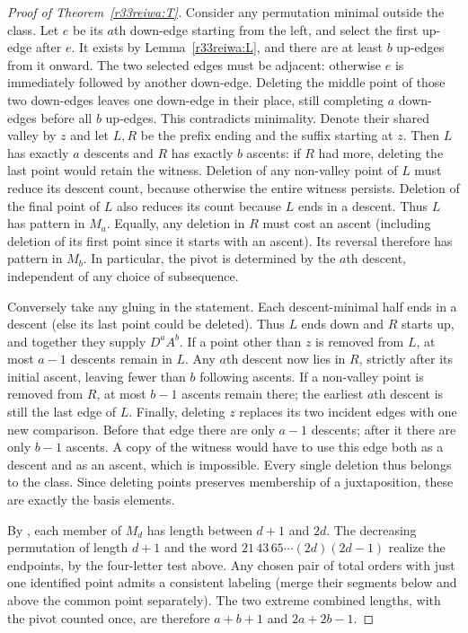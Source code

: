 \documentclass[11pt,a4paper]{article}
\numberwithin{equation}{section}
\theoremstyle{definition}
\theoremstyle{remark}
\begin{document}
\begin{proof}[Proof of Theorem~\ref{r33reiwa:T}]
Consider any permutation minimal outside the class. Let $e$ be its $a$th down-edge starting from the left, and select the first up-edge after $e$. It exists by Lemma~\ref{r33reiwa:L}, and there are at least $b$ up-edges from it onward. The two selected edges must be adjacent: otherwise $e$ is immediately followed by another down-edge. Deleting the middle point of those two down-edges leaves one down-edge in their place, still completing $a$ down-edges before all $b$ up-edges. This contradicts minimality. Denote their shared valley by $z$ and let $L,R$ be the prefix ending and the suffix starting at $z$. Then $L$ has exactly $a$ descents and $R$ has exactly $b$ ascents: if $R$ had more, deleting the last point would retain the witness. Deletion of any non-valley point of $L$ must reduce its descent count, because otherwise the entire witness persists. Deletion of the final point of $L$ also reduces its count because $L$ ends in a descent. Thus $L$ has pattern in $M_a$. Equally, any deletion in $R$ must cost an ascent (including deletion of its first point since it starts with an ascent). Its reversal therefore has pattern in $M_b$. In particular, the pivot is determined by the $a$th descent, independent of any choice of subsequence.

Conversely take any gluing in the statement. Each descent-minimal half ends in a descent (else its last point could be deleted). Thus $L$ ends down and $R$ starts up, and together they supply $D^aA^b$. If a point other than $z$ is removed from $L$, at most $a-1$ descents remain in $L$. Any $a$th descent now lies in $R$, strictly after its initial ascent, leaving fewer than $b$ following ascents. If a non-valley point is removed from $R$, at most $b-1$ ascents remain there; the earliest $a$th descent is still the last edge of $L$. Finally, deleting $z$ replaces its two incident edges with one new comparison. Before that edge there are only $a-1$ descents; after it there are only $b-1$ ascents. A copy of the witness would have to use this edge both as a descent and as an ascent, which is impossible. Every single deletion thus belongs to the class. Since deleting points preserves membership of a juxtaposition, these are exactly the basis elements.

By \cite[Prop.~2]{r33reiwa:BP}, each member of $M_d$ has length between $d+1$ and $2d$. The decreasing permutation of length $d+1$ and the word $21\,43\,65\cdots(2d)(2d-1)$ realize the endpoints, by the four-letter test above. Any chosen pair of total orders with just one identified point admits a consistent labeling (merge their segments below and above the common point separately). The two extreme combined lengths, with the pivot counted once, are therefore $a+b+1$ and $2a+2b-1$.
\end{proof}
\end{document}
